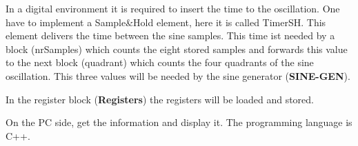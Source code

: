In a digital environment it is required to insert the time to the oscillation. One have to implement a Sample\&Hold element, here it is called TimerSH. This element delivers the time between the sine samples. This time ist needed by a block (nrSamples) which counts the eight stored samples and forwards this value to the next block (quadrant) which counts the four quadrants of the sine oscillation. This three values will be needed by the sine generator (\textbf{SINE-GEN}).

In the register block (\textbf{Registers}) the registers will be loaded and stored.

On the PC side, get the information and display it. The programming language is C++.
